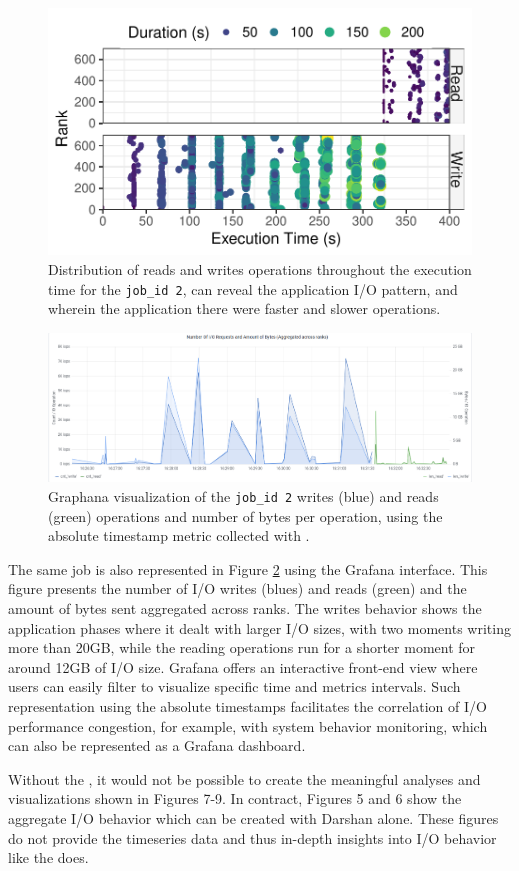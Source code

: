 \begin{figure}
	\centering
	\includegraphics[width=\linewidth]{figs/255653_mpi_io_luster_no_coll_execution2.pdf}
	\caption{Distribution of reads and writes operations
          throughout the execution time for the \texttt{job\_id 2},
          can reveal the application I/O pattern, and wherein the
          application there were faster and slower operations.}
	\label{f:mpi_io}
\end{figure}
\begin{figure}
	\centering
	\includegraphics[width=1\textwidth]{figs/255653_mpi_io_luster_no_coll.pdf}
	\caption{Graphana visualization of the \texttt{job\_id 2}
          writes (blue) and reads (green) operations and number of bytes per
          operation, using the absolute timestamp metric collected
	  with \Darshan{}.}
	  \label{f:mpi_io_grafana}
\end{figure}

The same job is also represented in Figure \ref{f:mpi_io_grafana}
using the Grafana interface. This figure presents the number of I/O
writes (blues) and reads (green) and the amount of bytes sent
aggregated across ranks. The writes behavior shows the application
phases where it dealt with larger I/O sizes, with two moments writing
more than 20GB, while the reading operations run for a shorter moment
for around 12GB of I/O size. Grafana offers an interactive front-end
view where users can easily filter to visualize specific time and
metrics intervals. Such representation using the absolute timestamps
facilitates the correlation of I/O performance congestion, for
example, with system behavior monitoring, which can also be
represented as a Grafana dashboard.

Without the \connector{}, it would not be possible to create the meaningful analyses and visualizations shown in Figures 7-9. In contract, Figures 5 and 6 show the aggregate I/O behavior which can be created with Darshan alone. These figures do not provide the timeseries data and thus in-depth insights into I/O behavior like the \Darshan{} does.

